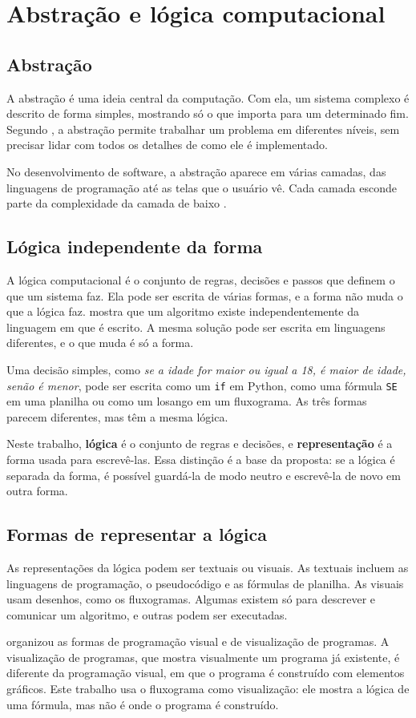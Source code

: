 \section{Abstração e lógica computacional}

\subsection{Abstração}

A abstração é uma ideia central da computação. Com ela, um sistema complexo é descrito de forma simples, mostrando só o que importa para um determinado fim. Segundo , a abstração permite trabalhar um problema em diferentes níveis, sem precisar lidar com todos os detalhes de como ele é implementado.

No desenvolvimento de software, a abstração aparece em várias camadas, das linguagens de programação até as telas que o usuário vê. Cada camada esconde parte da complexidade da camada de baixo \cite{abelson1996}.

\subsection{Lógica independente da forma}

A lógica computacional é o conjunto de regras, decisões e passos que definem o que um sistema faz. Ela pode ser escrita de várias formas, e a forma não muda o que a lógica faz.  mostra que um algoritmo existe independentemente da linguagem em que é escrito. A mesma solução pode ser escrita em linguagens diferentes, e o que muda é só a forma.

Uma decisão simples, como \textit{se a idade for maior ou igual a 18, é maior de idade, senão é menor}, pode ser escrita como um \texttt{if} em Python, como uma fórmula \texttt{SE} em uma planilha ou como um losango em um fluxograma. As três formas parecem diferentes, mas têm a mesma lógica.

Neste trabalho, \textbf{lógica} é o conjunto de regras e decisões, e \textbf{representação} é a forma usada para escrevê-las. Essa distinção é a base da proposta: se a lógica é separada da forma, é possível guardá-la de modo neutro e escrevê-la de novo em outra forma.

\subsection{Formas de representar a lógica}

As representações da lógica podem ser textuais ou visuais. As textuais incluem as linguagens de programação, o pseudocódigo e as fórmulas de planilha. As visuais usam desenhos, como os fluxogramas. Algumas existem só para descrever e comunicar um algoritmo, e outras podem ser executadas.

 organizou as formas de programação visual e de visualização de programas. A visualização de programas, que mostra visualmente um programa já existente, é diferente da programação visual, em que o programa é construído com elementos gráficos. Este trabalho usa o fluxograma como visualização: ele mostra a lógica de uma fórmula, mas não é onde o programa é construído.
